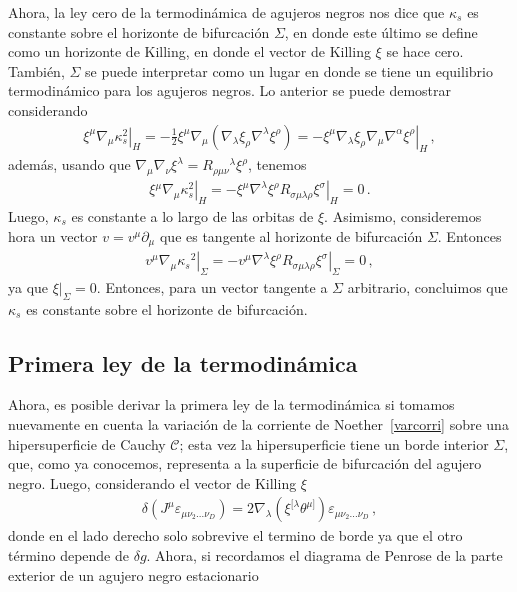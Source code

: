 \documentclass[../Main.tex]{subfiles}
\begin{document}
Ahora, la ley cero de la termodinámica de agujeros negros nos dice que $\kappa_s$ es constante sobre el horizonte de bifurcación $\Sigma$, en donde este último se define como un horizonte de Killing, en donde el vector de Killing $\xi$ se hace cero. También, $\Sigma$ se puede interpretar como un lugar en donde se tiene un equilibrio termodinámico para los agujeros negros. Lo anterior se puede demostrar considerando 
\begin{align}
\left.\xi^{\mu} \nabla_{\mu} \kappa_{s}^2\right|_H=-\frac{1}{2} \xi^{\mu} \nabla_{\mu}\left(\nabla_{\lambda} \xi_{\rho} \nabla^{\lambda} \xi^{\rho}\right)=-\left.\xi^{\mu} \nabla_{\lambda} \xi_{\rho} \nabla_{\mu} \nabla^{\alpha} \xi^{\rho}\right|_H \, ,
\end{align}
además, usando que $\nabla_\mu \nabla_\nu \xi^\lambda=R_{\rho \mu \nu}{}^\lambda \xi^\rho$, tenemos
\begin{align}
\left.\xi{^\mu} \nabla_{\mu} \kappa_s^{2}\right|_H=-\left.\xi^{\mu} \nabla^{\lambda} \xi^{\rho} R_{\sigma \mu \lambda \rho} \xi^{\sigma}\right|_H=0 \, .
\end{align}
Luego, $\kappa_s$ es constante a lo largo de las orbitas de $\xi$. Asimismo, consideremos hora un vector $v=v^{\mu} \partial_{\mu}$ que es tangente al horizonte de bifurcación $\Sigma$. Entonces 
\begin{align}
\left.v^{\mu} \nabla_{\mu} \kappa_s{^2}\right|_{\Sigma}=-\left.v^{\mu} \nabla^{\lambda }\xi^{\rho} R_{\sigma \mu \lambda \rho} \xi^{\sigma}\right|_{\Sigma}=0  \, ,
\end{align}
ya que $\xi|_{\Sigma}=0$. Entonces, para un vector tangente a $\Sigma$ arbitrario, concluimos que $\kappa_s$ es constante sobre el horizonte de bifurcación.

\subsection{Primera ley de la termodinámica}

Ahora, es posible derivar la primera ley de la termodinámica si tomamos nuevamente en cuenta la variación de la corriente de Noether~\eqref{varcorri} sobre una hipersuperficie de Cauchy $\mathcal{C}$; esta vez la hipersuperficie tiene un borde interior $\Sigma$, que, como ya conocemos, representa a la superficie de bifurcación del agujero negro. Luego, considerando el vector de Killing $\xi$
\begin{align}
\delta\left(J^\mu \varepsilon_{\mu \nu_2 \ldots \nu_D}\right)=2 \nabla_\lambda\left(\xi^{[\lambda} \theta^{\mu]}\right) \varepsilon_{\mu \nu_2 \ldots \nu_D}\, ,
\end{align}
donde en el lado derecho solo sobrevive el termino de borde ya que el otro término depende de $\delta g$.
Ahora, si recordamos el diagrama de Penrose de la parte exterior de un agujero negro estacionario 
\end{document}
